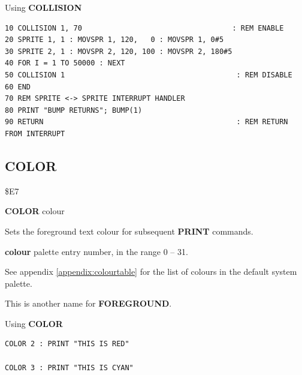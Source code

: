 \begin{description}[leftmargin=2cm,style=nextline]
\item [Example:] Using {\bf COLLISION}

\begin{tcolorbox}[colback=black,coltext=white]
\verbatimfont{\codefont}
\begin{verbatim}
10 COLLISION 1, 70                                   : REM ENABLE
20 SPRITE 1, 1 : MOVSPR 1, 120,   0 : MOVSPR 1, 0#5
30 SPRITE 2, 1 : MOVSPR 2, 120, 100 : MOVSPR 2, 180#5
40 FOR I = 1 TO 50000 : NEXT
50 COLLISION 1                                        : REM DISABLE
60 END
70 REM SPRITE <-> SPRITE INTERRUPT HANDLER
80 PRINT "BUMP RETURNS"; BUMP(1)
90 RETURN                                             : REM RETURN FROM INTERRUPT
\end{verbatim}
\end{tcolorbox}
\end{description}


\newpage
\subsection{COLOR}
\begin{description}[leftmargin=2cm,style=nextline]
\item [Token:]   \$E7

\item [Format:]  {\bf COLOR} colour

\item [Usage:]   Sets the foreground text colour for subsequent {\bf PRINT} commands.

                 {\bf colour} palette entry number, in the range 0 -- 31.

                 See appendix \vref{appendix:colourtable} for the list of colours in the default system palette.

\item [Remarks:] This is another name for {\bf FOREGROUND}.

\item [Example:] Using {\bf COLOR}

\begin{tcolorbox}[colback=black,coltext=white]
\verbatimfont{\codefont}
\begin{verbatim}
COLOR 2 : PRINT "THIS IS RED"

COLOR 3 : PRINT "THIS IS CYAN"
\end{verbatim}
\end{tcolorbox}
\end{description}

